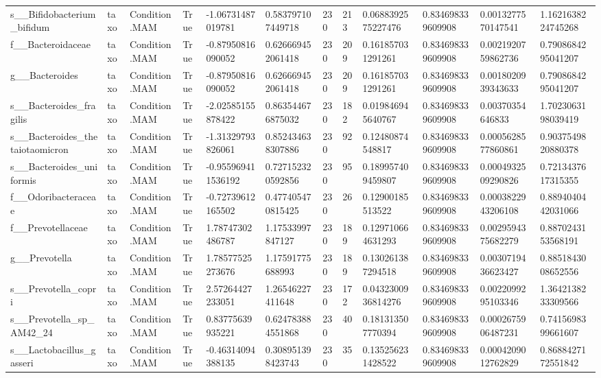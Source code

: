 \begin{longtable}{llllllllllll}
s\_\_Bifidobacterium\_bifidum & taxo & Condition.MAM & True & -1.06731487019781 & 0.583797107449718 & 230 & 213 & 0.0688392575227476 & 0.834698339609908 & 0.0013277570147541 & 1.1621638224745268 \\
f\_\_Bacteroidaceae & taxo & Condition.MAM & True & -0.87950816090052 & 0.626669452061418 & 230 & 209 & 0.161857031291261 & 0.834698339609908 & 0.0021920759862736 & 0.7908684295041207 \\
g\_\_Bacteroides & taxo & Condition.MAM & True & -0.87950816090052 & 0.626669452061418 & 230 & 209 & 0.161857031291261 & 0.834698339609908 & 0.0018020939343633 & 0.7908684295041207 \\
s\_\_Bacteroides\_fragilis & taxo & Condition.MAM & True & -2.02585155878422 & 0.863544676875032 & 230 & 182 & 0.019846945640767 & 0.834698339609908 & 0.00370354646833 & 1.7023063198039419 \\
s\_\_Bacteroides\_thetaiotaomicron & taxo & Condition.MAM & True & -1.31329793826061 & 0.852434638307886 & 230 & 92 & 0.12480874548817 & 0.834698339609908 & 0.0005628577860861 & 0.9037549820880378 \\
s\_\_Bacteroides\_uniformis & taxo & Condition.MAM & True & -0.955969411536192 & 0.727152320592856 & 230 & 95 & 0.189957409459807 & 0.834698339609908 & 0.0004932509290826 & 0.7213437617315355 \\
f\_\_Odoribacteraceae & taxo & Condition.MAM & True & -0.72739612165502 & 0.477405470815425 & 230 & 26 & 0.12900185513522 & 0.834698339609908 & 0.0003822943206108 & 0.8894040442031066 \\
f\_\_Prevotellaceae & taxo & Condition.MAM & True & 1.78747302486787 & 1.17533997847127 & 230 & 189 & 0.129710664631293 & 0.834698339609908 & 0.0029594375682279 & 0.8870243153568191 \\
g\_\_Prevotella & taxo & Condition.MAM & True & 1.78577525273676 & 1.17591775688993 & 230 & 189 & 0.130261387294518 & 0.834698339609908 & 0.0030719436623427 & 0.8851843008652556 \\
s\_\_Prevotella\_copri & taxo & Condition.MAM & True & 2.57264427233051 & 1.26546227411648 & 230 & 172 & 0.0432300936814276 & 0.834698339609908 & 0.0022099295103346 & 1.3642138233309566 \\
s\_\_Prevotella\_sp\_AM42\_24 & taxo & Condition.MAM & True & 0.83775639935221 & 0.624783884551868 & 230 & 40 & 0.181313507770394 & 0.834698339609908 & 0.0002675906487231 & 0.7415698399661607 \\
s\_\_Lactobacillus\_gasseri & taxo & Condition.MAM & True & -0.46314094388135 & 0.308951398423743 & 230 & 35 & 0.135256231428522 & 0.834698339609908 & 0.0004209012762829 & 0.8688427172551842 \\

\end{longtable}
